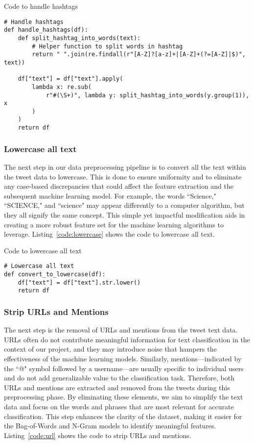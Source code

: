 \documentclass{article}
\begin{document}
\begin{listing}[H]
\caption{Code to handle hashtags}
\label{code:hashtag}
\begin{verbatim}
# Handle hashtags
def handle_hashtags(df):
    def split_hashtag_into_words(text):
        # Helper function to split words in hashtag
        return " ".join(re.findall(r"[A-Z]?[a-z]+|[A-Z]+(?=[A-Z]|$)", text))
        
    df["text"] = df["text"].apply(
        lambda x: re.sub(
            r"#(\S+)", lambda y: split_hashtag_into_words(y.group(1)), x
        )
    )
    return df
\end{verbatim}
\end{listing}


\subsubsection{Lowercase all text}

The next step in our data preprocessing pipeline is to convert all the text within the tweet data to lowercase. This is done to ensure uniformity and to eliminate any case-based discrepancies that could affect the feature extraction and the subsequent machine learning model. For example, the words “Science," “SCIENCE," and “science" may appear differently to a computer algorithm, but they all signify the same concept. This simple yet impactful modification aids in creating a more robust feature set for the machine learning algorithms to leverage. Listing~\ref{code:lowercase} shows the code to lowercase all text.

\begin{listing}[H]
\caption{Code to lowercase all text}
\label{code:lowercase}
\begin{verbatim}
# Lowercase all text
def convert_to_lowercase(df):
    df["text"] = df["text"].str.lower()
    return df
\end{verbatim}
\end{listing}


\subsubsection{Strip URLs and Mentions}

The next step is the removal of URLs and mentions from the tweet text data. URLs often do not contribute meaningful information for text classification in the context of our project, and they may introduce noise that hampers the effectiveness of the machine learning models. Similarly, mentions—indicated by the “@" symbol followed by a username—are usually specific to individual users and do not add generalizable value to the classification task. Therefore, both URLs and mentions are extracted and removed from the tweets during this preprocessing phase. By eliminating these elements, we aim to simplify the text data and focus on the words and phrases that are most relevant for accurate classification. This step enhances the clarity of the dataset, making it easier for the Bag-of-Words and N-Gram models to identify meaningful features. Listing~\ref{code:url} shows the code to strip URLs and mentions.
\end{document}
